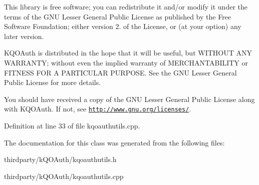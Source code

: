 This library is free software; you can redistribute it and/or modify it under the terms of the G\+NU Lesser General Public License as published by the Free Software Foundation; either version 2. of the License, or (at your option) any later version.

K\+Q\+O\+Auth is distributed in the hope that it will be useful, but W\+I\+T\+H\+O\+UT A\+NY W\+A\+R\+R\+A\+N\+TY; without even the implied warranty of M\+E\+R\+C\+H\+A\+N\+T\+A\+B\+I\+L\+I\+TY or F\+I\+T\+N\+E\+SS F\+OR A P\+A\+R\+T\+I\+C\+U\+L\+AR P\+U\+R\+P\+O\+SE. See the G\+NU Lesser General Public License for more details.

You should have received a copy of the G\+NU Lesser General Public License along with K\+Q\+O\+Auth. If not, see \href{http://www.gnu.org/licenses/}{\tt http\+://www.\+gnu.\+org/licenses/}. 

Definition at line 33 of file kqoauthutils.\+cpp.



The documentation for this class was generated from the following files\+:\begin{DoxyCompactItemize}
\item 
thirdparty/k\+Q\+O\+Auth/kqoauthutils.\+h\item 
thirdparty/k\+Q\+O\+Auth/kqoauthutils.\+cpp\end{DoxyCompactItemize}
